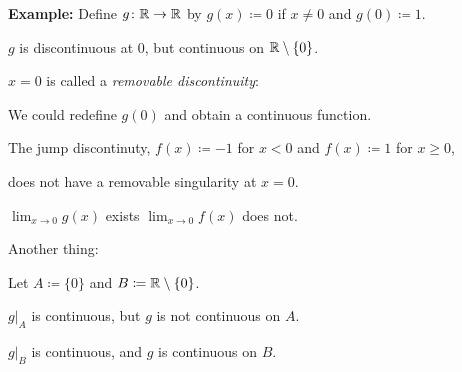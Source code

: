 \documentclass[10pt,aspectratio=169]{beamer}
\begin{document}
\begin{frame}

\textbf{Example:}
Define $g \colon {\mathbb{R}} \to {\mathbb{R}}$ by $g(x) \coloneqq 0$ if $x \not= 0$ and
$g(0) \coloneqq 1$.

\pause
\medskip

$g$ is discontinuous at $0$, but continuous on ${\mathbb{R}} \setminus \{ 0 \}$.

\pause
\medskip

$x=0$ is called a \emph{removable discontinuity}:

We could redefine $g(0)$ and obtain a continuous function.

\pause
\medskip

The jump discontinuty, $f(x) \coloneqq -1$ for $x < 0$ and $f(x) \coloneqq 1$ for $x \geq 0$,

does not have a removable singularity at $x=0$.

\pause
\medskip

$\displaystyle \lim_{x\to 0} g(x)$ exists \quad $\displaystyle \lim_{x\to 0} f(x)$ does not.

\pause
\medskip

Another thing:

Let $A \coloneqq \{ 0\}$ and $B\coloneqq {\mathbb{R}} \setminus \{0\}$.

\pause
\medskip

$g|_A$ is continuous, but $g$ is not continuous on $A$.

\pause
\medskip

$g|_B$ is continuous, and $g$ is continuous on $B$.

\end{frame}
\end{document}
